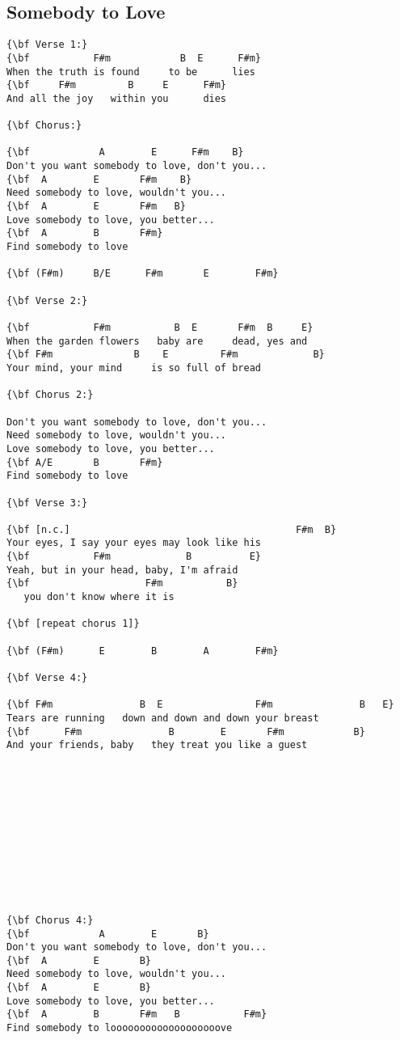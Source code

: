 \documentclass[a4paper]{article}
\begin{document}
\subsection{Somebody to Love} %
\label{sub:Somebody to Love}
\begin{Verbatim}[commandchars=\\\{\}]
{\bf Verse 1:}
{\bf           F#m            B  E      F#m}
When the truth is found     to be      lies
{\bf     F#m         B     E      F#m}
And all the joy   within you      dies

{\bf Chorus:}

{\bf            A        E      F#m    B}
Don't you want somebody to love, don't you...
{\bf  A        E       F#m    B}
Need somebody to love, wouldn't you...
{\bf  A        E       F#m   B}
Love somebody to love, you better...
{\bf  A        B       F#m}
Find somebody to love

{\bf (F#m)     B/E      F#m       E        F#m}

{\bf Verse 2:}

{\bf           F#m           B  E       F#m  B     E}
When the garden flowers   baby are     dead, yes and
{\bf F#m              B    E         F#m             B}
Your mind, your mind     is so full of bread

{\bf Chorus 2:}

Don't you want somebody to love, don't you...
Need somebody to love, wouldn't you...
Love somebody to love, you better...
{\bf A/E       B       F#m}
Find somebody to love

{\bf Verse 3:}

{\bf [n.c.]                                       F#m  B}
Your eyes, I say your eyes may look like his
{\bf           F#m             B          E}
Yeah, but in your head, baby, I'm afraid
{\bf                    F#m           B}
   you don't know where it is

{\bf [repeat chorus 1]}

{\bf (F#m)      E        B        A        F#m}

{\bf Verse 4:}

{\bf F#m               B  E                F#m               B   E}
Tears are running   down and down and down your breast
{\bf      F#m               B        E       F#m            B}
And your friends, baby   they treat you like a guest












{\bf Chorus 4:}
{\bf            A        E       B}
Don't you want somebody to love, don't you...
{\bf  A        E       B}
Need somebody to love, wouldn't you...
{\bf  A        E       B}
Love somebody to love, you better...
{\bf  A        B       F#m   B           F#m}
Find somebody to looooooooooooooooooove
\end{Verbatim}
\newpage
\end{document}
